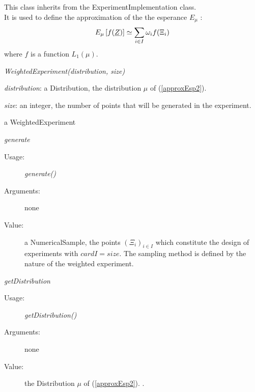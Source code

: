 This class inherits from the ExperimentImplementation class.\\

It is used to define the approximation of the the esperance $E_{\mu}$ :
\begin{equation}\label{approxEsp2}
E_{\mu} \left[ f({\underline{Z}}) \right] \simeq \sum_{i \in I} \omega_i f(\Xi_i)
\end{equation}
where $f$ is a function $L_1(\mu)$.


\begin{description}

\item[Usage:] \textit{WeightedExperiment(distribution, size)}

\item[Arguments:]  \rule{0pt}{1em}
\begin{description}
\item \textit{distribution}: a Distribution, the distribution $\mu$ of (\ref{approxEsp2}).
\item \textit{size}: an integer, the number of points that will be generated in the experiment.
\end{description}


\item[Value:] a WeightedExperiment

\item[Some methods :]  \rule{0pt}{1em}

\begin{description}

\item \textit{generate}
\begin{description}
\item[Usage:] \textit{generate()}
\item[Arguments:] none
\item[Value:] a NumericalSample, the points $(\Xi_i)_{i \in I}$ which constitute the design of experiments  with $card I = size$. The sampling method is defined by the nature of the weighted experiment.
\end{description}
\bigskip

\item \textit{getDistribution}
\begin{description}
\item[Usage:] \textit{getDistribution()}
\item[Arguments:] none
\item[Value:] the Distribution $\mu$ of (\ref{approxEsp2}).
.
\end{description}
\bigskip


\end{description}
\end{description}
